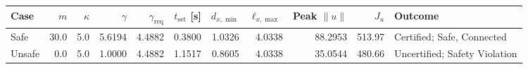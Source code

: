 \begin{tabular}{@{}lrrrrrrrrrl@{}}\toprule
Case & $m$ & $\kappa$ & $\gamma$ & $\gamma_{\mathrm{req}}$ & $t_{\mathrm{set}}$ [s] & $d_{x,\min}$ & $\ell_{x,\max}$ & Peak $\|u\|$ & $J_u$ & Outcome \\\midrule
Safe & 30.0 & 5.0 & 5.6194 & 4.4882 & 0.3800 & 1.0326 & 4.0338 & 88.2953 & 513.97 & Certified; Safe, Connected \\
Unsafe & 0.0 & 5.0 & 1.0000 & 4.4882 & 1.1517 & 0.8605 & 4.0338 & 35.0544 & 480.66 & Uncertified; Safety Violation \\
\bottomrule\end{tabular}
